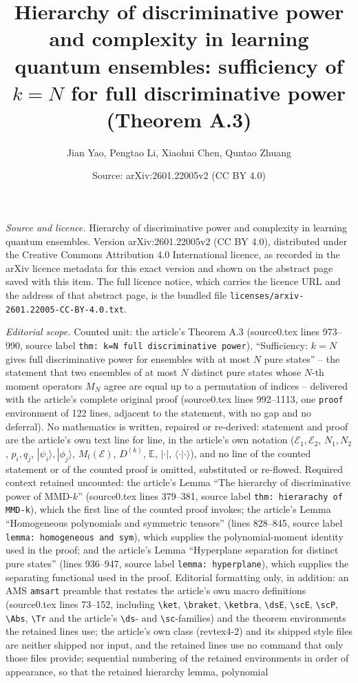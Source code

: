 \documentclass[10pt,a4paper]{amsart}
\title[Hierarchy of discriminative power and complexity in learning quantum ensembles]{Hierarchy of discriminative power and complexity in learning quantum ensembles: sufficiency of $k=N$ for full discriminative power (Theorem A.3)}
\author{Jian Yao, Pengtao Li, Xiaohui Chen, Quntao Zhuang}
\date{Source: arXiv:2601.22005v2 (CC BY 4.0)}
\newcommand{\Abs}[1]{\left\lvert #1\right\rvert}
\providecommand{\ket}[1]{|#1 \rangle}
\providecommand{\braket}[2]{\langle #1|#2 \rangle}
\newcommand{\dsE}{\mathbb{E}}
\newcommand{\scE}{\mathcal{E}}
\theoremstyle{plain}
\theoremstyle{definition}
\theoremstyle{remark}
\begin{document}
\maketitle

\noindent\emph{Source and licence.} Hierarchy of discriminative power and complexity in learning quantum ensembles. Version arXiv:2601.22005v2 (CC BY 4.0), distributed under the Creative Commons Attribution 4.0 International licence, as recorded in the arXiv licence metadata for this exact version and shown on the abstract page saved with this item. The full licence notice, which carries the licence URL and the address of that abstract page, is the bundled file \texttt{licenses/arxiv-2601.22005-CC-BY-4.0.txt}.\par\smallskip

\noindent\textit{Editorial scope.} Counted unit: the article's Theorem A.3 (source0.tex lines 973--990, source label \texttt{thm: k=N full discriminative power}), ``Sufficiency: $k=N$ gives full discriminative power for ensembles with at most $N$ pure states'' -- the statement that two ensembles of at most $N$ distinct pure states whose $N$-th moment operators $M_N$ agree are equal up to a permutation of indices -- delivered with the article's complete original proof (source0.tex lines 992--1113, one \texttt{proof} environment of 122 lines, adjacent to the statement, with no gap and no deferral). No mathematics is written, repaired or re-derived: statement and proof are the article's own text line for line, in the article's own notation ($\scE_1,\scE_2$, $N_1,N_2$, $p_i,q_j$, $\ket{\psi_i},\ket{\phi_j}$, $M_t(\mathcal E)$, $D^{(k)}$, $\dsE$, $\Abs{\cdot}$, $\braket{\cdot}{\cdot}$), and no line of the counted statement or of the counted proof is omitted, substituted or re-flowed. Required context retained uncounted: the article's Lemma ``The hierarchy of discriminative power of MMD-$k$'' (source0.tex lines 379--381, source label \texttt{thm: hierarachy of MMD-k}), which the first line of the counted proof invokes; the article's Lemma ``Homogeneous polynomials and symmetric tensors'' (lines 828--845, source label \texttt{lemma: homogeneous and sym}), which supplies the polynomial-moment identity used in the proof; and the article's Lemma ``Hyperplane separation for distinct pure states'' (lines 936--947, source label \texttt{lemma: hyperplane}), which supplies the separating functional used in the proof. Editorial formatting only, in addition: an AMS \texttt{amsart} preamble that restates the article's own macro definitions (source0.tex lines 73--152, including \texttt{\textbackslash ket}, \texttt{\textbackslash braket}, \texttt{\textbackslash ketbra}, \texttt{\textbackslash dsE}, \texttt{\textbackslash scE}, \texttt{\textbackslash scP}, \texttt{\textbackslash Abs}, \texttt{\textbackslash Tr} and the article's \texttt{\textbackslash ds}- and \texttt{\textbackslash sc}-families) and the theorem environments the retained lines use; the article's own class (revtex4-2) and its shipped style files are neither shipped nor input, and the retained lines use no command that only those files provide; sequential numbering of the retained environments in order of appearance, so that the retained hierarchy lemma, polynomial 
\end{document}
